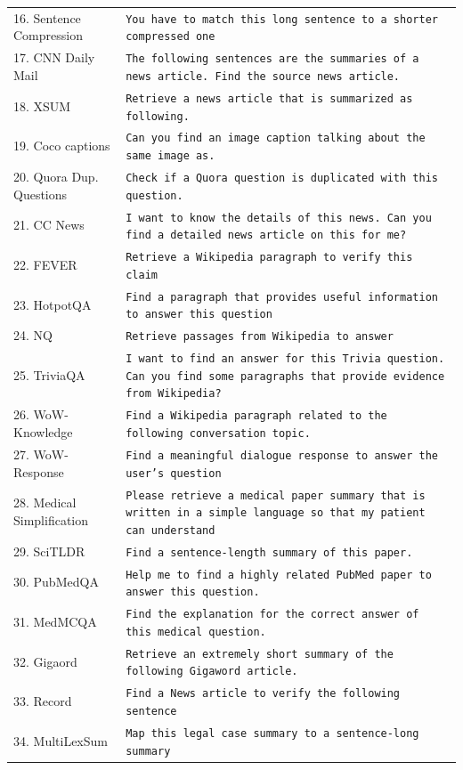 \begin{table}[t!]
\begin{tabular}{lp{12cm}}
16. Sentence Compression & \texttt{You have to match this long sentence to a shorter compressed one} \\
17. CNN Daily Mail & \texttt{The following sentences are the summaries of a news article. Find the source news article.} \\
18. XSUM & \texttt{Retrieve a news article that is summarized as following.} \\
19. Coco captions & \texttt{Can you find an image caption talking about the same image as.} \\
20. Quora Dup. Questions & \texttt{Check if a Quora question is duplicated with this question.} \\
21. CC News & \texttt{I want to know the details of this news. Can you find a detailed news article on this for me?} \\
22. FEVER & \texttt{Retrieve a Wikipedia paragraph to verify this claim} \\
23. HotpotQA & \texttt{Find a paragraph that provides useful information to answer this question} \\
24. NQ & \texttt{Retrieve passages from Wikipedia to answer} \\
25. TriviaQA & \texttt{I want to find an answer for this Trivia question. Can you find some paragraphs that provide evidence from Wikipedia?} \\
26. WoW-Knowledge & \texttt{Find a Wikipedia paragraph related to the following conversation topic.} \\
27. WoW-Response & \texttt{Find a meaningful dialogue response to answer the user's question} \\
28. Medical Simplification & \texttt{Please retrieve a medical paper summary that is written in a simple language so that my patient can understand} \\
29. SciTLDR & \texttt{Find a sentence-length summary of this paper.} \\
30. PubMedQA & \texttt{Help me to find a highly related PubMed paper to answer this question.} \\
31. MedMCQA & \texttt{Find the explanation for the correct answer of this medical question.} \\
32. Gigaord & \texttt{Retrieve an extremely short summary of the following Gigaword article.} \\
33. Record & \texttt{Find a News article to verify the following sentence} \\
34. MultiLexSum & \texttt{Map this legal case summary to a sentence-long summary} \\

\end{tabular}
\end{table}
